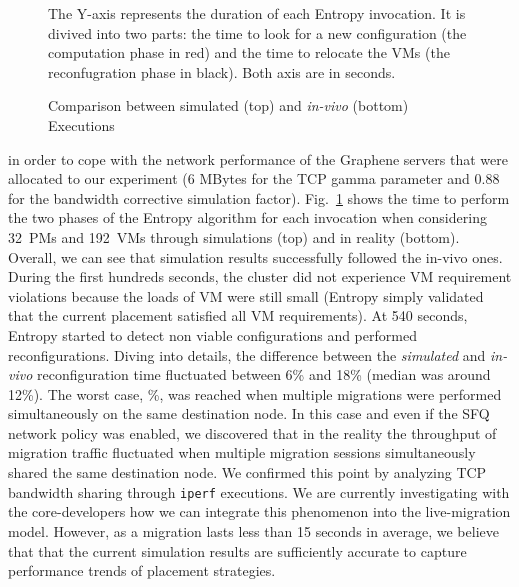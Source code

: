 \begin{figure}
\vspace*{-.32cm}
\caption{Comparison between simulated (top) and \textit{in-vivo}
  (bottom) Executions}
\vspace*{-.28cm}
\flushleft\scriptsize{The Y-axis represents the duration of each Entropy
  invocation. It is divived into two parts: the time to look for a
  new configuration (the computation phase in red) and the time to
  relocate the VMs (the reconfugration phase in black). Both axis are
  in seconds.
}
\label{fig:usecase-vivosimu}
\vspace*{-.9cm}
\end{figure}
in order to cope with the network performance of the Graphene servers that were allocated to our
experiment (6 MBytes for the TCP gamma parameter and 0.88 for the
bandwidth corrective simulation factor).
%
Fig.~\ref{fig:usecase-vivosimu} shows the time to perform the two phases of
the Entropy algorithm for each invocation when considering 32~PMs and
192~VMs through simulations (top) and in reality (bottom). Overall, we can see that simulation results successfully
followed the in-vivo ones. During the first hundreds seconds, the cluster did not
experience VM requirement violations because the loads of VM were
still small (\ie Entropy simply validated that the current placement
satisfied all VM requirements). At 540 seconds, Entropy started to
detect non viable configurations and performed reconfigurations.
Diving into details, the difference between the \textit{simulated} and
\textit{in-vivo} reconfiguration time fluctuated between 6\% and 18\%
(median was around 12\%). %
The worst case, \%, was reached when
multiple migrations were performed simultaneously on the same
destination node.
 In this case and even if the SFQ network policy was
enabled, we discovered that in the reality the throughput of migration
traffic fluctuated when multiple migration sessions simultaneously
shared the same destination node. We confirmed this point by analyzing
TCP bandwidth sharing through \texttt{iperf} executions. We are
currently investigating with the \sg core-developers how we can
integrate this phenomenon into the live-migration model. However, as a
migration lasts less than 15 seconds in average, we believe that that
the current simulation results are sufficiently accurate to capture
performance trends of placement strategies.


